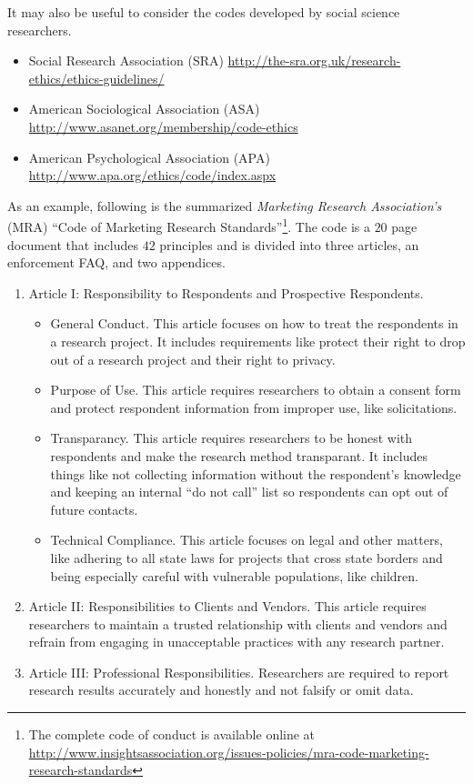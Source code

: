 It may also be useful to consider the codes developed by social science researchers.

\begin{itemize}
	\item Social Research Association (SRA) \url{http://the-sra.org.uk/research-ethics/ethics-guidelines/}
	\item American Sociological Association (ASA) \url{http://www.asanet.org/membership/code-ethics}
	\item American Psychological Association (APA) \url{http://www.apa.org/ethics/code/index.aspx}
\end{itemize}

As an example, following is the summarized \textit{Marketing Research Association's} (MRA) ``Code of Marketing Research Standards''\footnote{The complete code of conduct is available online at \url{http://www.insightsassociation.org/issues-policies/mra-code-marketing-research-standards}}. The code is a $ 20 $ page document that includes $ 42 $ principles and is divided into three articles, an enforcement FAQ, and two appendices.

\begin{enumerate}
	\item Article I: Responsibility to Respondents and Prospective Respondents. 
	
	\begin{itemize}
		\item General Conduct. This article focuses on how to treat the respondents in a research project. It includes requirements like protect their right to drop out of a research project and their right to privacy.
		\item Purpose of Use. This article requires researchers to obtain a consent form and protect respondent information from improper use, like solicitations.
		\item Transparancy. This article requires researchers to be honest with respondents and make the research method transparant. It includes things like not collecting information without the respondent's knowledge and keeping an internal ``do not call'' list so respondents can opt out of future contacts.
		\item Technical Compliance. This article focuses on legal and other matters, like adhering to all state laws for projects that cross state borders and being especially careful with vulnerable populations, like children.
	\end{itemize}
	
	\item Article II: Responsibilities to Clients and Vendors. This article requires researchers to maintain a trusted relationship with clients and vendors and refrain from engaging in unacceptable practices with any research partner.
	
	\item Article III: Professional Responsibilities. Researchers are required to report research results accurately and honestly and not falsify or omit data.
	
\end{enumerate}

